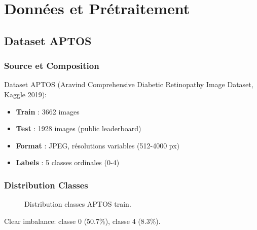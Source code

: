 \documentclass[12pt,a4paper,oneside]{report}
\begin{document}
\newpage


\chapter{Données et Prétraitement}

\section{Dataset APTOS}

\subsection{Source et Composition}

Dataset APTOS (Aravind Comprehensive Diabetic Retinopathy Image Dataset, 
Kaggle 2019):

\begin{itemize}
    \item \textbf{Train} : 3662 images
    \item \textbf{Test} : 1928 images (public leaderboard)
    \item \textbf{Format} : JPEG, résolutions variables (512-4000 px)
    \item \textbf{Labels} : 5 classes ordinales (0-4)
\end{itemize}

\subsection{Distribution Classes}

\begin{figure}[H]
\centering
{}
\caption{Distribution classes APTOS train.}
\label{fig:class_distribution}
\end{figure}

Clear imbalance: classe 0 (50.7\%), classe 4 (8.3\%).
\end{document}
